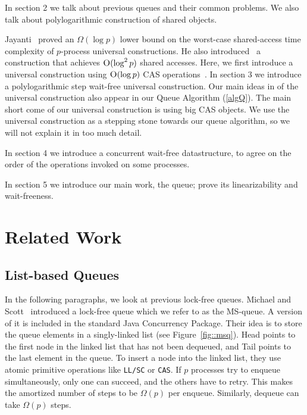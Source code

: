 \documentclass[10pt]{article}
\theoremstyle{definition}
\begin{document}
In section 2 we talk about previous queues and their common problems. We also talk about polylogarithmic construction of shared objects.

Jayanti~\cite{DBLP:conf/podc/Jayanti98a} proved an $\Omega(\log p)$ lower bound on the worst-case shared-access time complexity of $p$-process universal constructions. He also introduced~\cite{DBLP:conf/podc/ChandraJT98} a construction that achieves $\textsc{O}(\log^2 p)$ shared accesses. Here, we first introduce a universal construction using $\textsc{O}(\log p)$ CAS operations~\cite{DBLP:conf/fsttcs/JayantiP05}. In section 3 we introduce a polylogarithmic step wait-free universal construction. Our main ideas in of the universal construction also appear in our Queue Algorithm (\ref{algQ}). The main short come of our universal construction is using big CAS objects. We use the universal construction as a stepping stone towards our queue algorithm, so we will not explain it in too much detail.

In section 4 we introduce a concurrent wait-free datastructure, to agree on the order of the operations invoked on some processes.

In section 5 we introduce our main work, the queue; prove its linearizability and wait-freeness.

\pagebreak
\section{Related Work}
\subsection{List-based Queues}
In the following paragraphs, we look at previous lock-free queues.
Michael and Scott~\cite{DBLP:conf/podc/MichaelS96} introduced a lock-free queue which we refer to as the MS-queue. A version of it is included in the standard Java Concurrency Package. Their idea is to store the queue elements in a singly-linked list (see Figure~\ref{fig::msq}). Head points to the first node in the linked list that has not been dequeued, and Tail points to the last element in the queue. To insert a node into the linked list, they use atomic primitive operations like \texttt{LL/SC} or \texttt{CAS}. If $p$ processes try to enqueue simultaneously, only one can succeed, and the others have to retry. This makes the amortized number of steps to be $\Omega(p)$ per enqueue. Similarly, dequeue can take $\Omega(p)$ steps.
\end{document}

